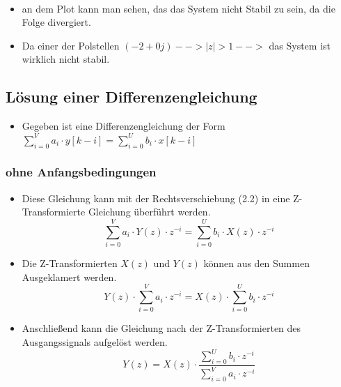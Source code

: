 \documentclass[11pt]{article}
\providecommand{\tightlist}{%
      \setlength{\itemsep}{0pt}\setlength{\parskip}{0pt}}
\def\gt{>}
\begin{document}
    \begin{center}
    \end{center}
    { \hspace*{\fill} \\}
    
    \begin{itemize}
\item
  an dem Plot kann man sehen, das das System nicht Stabil zu sein, da
  die Folge divergiert.
\item
  Da einer der Polstellen \((-2 + 0j) --> |z| \gt 1 -->\) das System ist
  wirklich nicht stabil.
\end{itemize}

    \subsection{Lösung einer
Differenzengleichung}\label{luxf6sung-einer-differenzengleichung}

\begin{itemize}
\tightlist
\item
  Gegeben ist eine Differenzengleichung der Form
  \(\sum_{i=0}^V a_i \cdot y[k-i] = \sum_{i=0}^U b_i \cdot x[k-i]\)
\end{itemize}

    \subsubsection{ohne Anfangsbedingungen}\label{ohne-anfangsbedingungen}

\begin{itemize}
\tightlist
\item
  Diese Gleichung kann mit der Rechtsverschiebung (2.2) in eine
  Z-Transformierte Gleichung überführt werden.
  \[\sum_{i=0}^V a_i \cdot Y(z) \cdot z^{-i} = \sum_{i=0}^U b_i \cdot X(z) \cdot z^{-i}\]
\end{itemize}

    \begin{itemize}
\tightlist
\item
  Die Z-Transformierten \(X(z)\) und \(Y(z)\) können aus den Summen
  Ausgeklamert werden.
  \[Y(z) \cdot \sum_{i=0}^V a_i \cdot z^{-i} = X(z) \cdot \sum_{i=0}^U b_i \cdot z^{-i}\]
\end{itemize}

    \begin{itemize}
\tightlist
\item
  Anschließend kann die Gleichung nach der Z-Transformierten des
  Ausgangssignals aufgelöst werden.
  \[Y(z) = X(z) \cdot \frac{\sum_{i=0}^U b_i \cdot z^{-i}}{\sum_{i=0}^V a_i \cdot z^{-i}}\]
\end{itemize}
\end{document}
